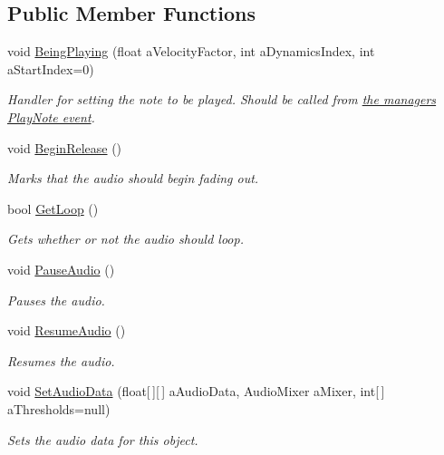 \subsection*{Public Member Functions}
\begin{DoxyCompactItemize}
\item 
void \hyperlink{group___n_o_o_pub_func_ga2bdaa2787408f353f71ef6c6a18e9285}{Being\+Playing} (float a\+Velocity\+Factor, int a\+Dynamics\+Index, int a\+Start\+Index=0)
\begin{DoxyCompactList}\small\item\em Handler for setting the note to be played. Should be called from \hyperlink{group___v_i_m_event_types_class_virtual_instrument_manager_1_1_play_note_event}{the manager\textquotesingle{}s Play\+Note event}. \end{DoxyCompactList}\item 
void \hyperlink{group___n_o_o_pub_func_ga044e62759958d717c7fa4fd1615e2ec1}{Begin\+Release} ()
\begin{DoxyCompactList}\small\item\em Marks that the audio should begin fading out. \end{DoxyCompactList}\item 
bool \hyperlink{group___n_o_o_pub_func_ga24d76043802c442f571c5c34a854ff86}{Get\+Loop} ()
\begin{DoxyCompactList}\small\item\em Gets whether or not the audio should loop. \end{DoxyCompactList}\item 
void \hyperlink{group___n_o_o_pub_func_ga7977bc941f355866c7e4c141a8f7b8bb}{Pause\+Audio} ()
\begin{DoxyCompactList}\small\item\em Pauses the audio. \end{DoxyCompactList}\item 
void \hyperlink{group___n_o_o_pub_func_ga2df8edec357dd4123146c9a7e8485ffb}{Resume\+Audio} ()
\begin{DoxyCompactList}\small\item\em Resumes the audio. \end{DoxyCompactList}\item 
void \hyperlink{group___n_o_o_pub_func_gaef9ab691f0a2671a62249d853f24162d}{Set\+Audio\+Data} (float\mbox{[}$\,$\mbox{]}\mbox{[}$\,$\mbox{]} a\+Audio\+Data, Audio\+Mixer a\+Mixer, int\mbox{[}$\,$\mbox{]} a\+Thresholds=null)
\begin{DoxyCompactList}\small\item\em Sets the audio data for this object. \end{DoxyCompactList}\item 

\end{DoxyCompactItemize}
